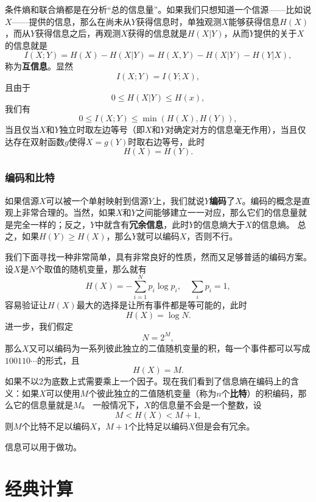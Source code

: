 \documentclass[UTF8, a4paper]{ctexart}
\begin{document}
条件熵和联合熵都是在分析“总的信息量”。如果我们只想知道一个信源——比如说$X$——提供的信息，那么在尚未从$Y$获得信息时，单独观测$X$能够获得信息$H(X)$，而从$Y$获得信息之后，再观测$X$获得的信息就是$H(X|Y)$，从而$Y$提供的关于$X$的信息就是
\begin{equation}
    I(X;Y) = H(X) - H(X|Y) = H(X, Y) - H(X|Y) - H(Y|X),
\end{equation}
称为\textbf{互信息}。显然
\begin{equation}
    I(X;Y) = I(Y;X),
\end{equation}
且由于
\[
    0 \leq H(X|Y) \leq H(x),
\]
我们有
\begin{equation}
    0 \leq I(X;Y) \leq \min(H(X), H(Y)),
\end{equation}
当且仅当$X$和$Y$独立时取左边等号（即$X$和$Y$对确定对方的信息毫无作用），当且仅达存在双射函数$g$使得$X=g(Y)$时取右边等号，此时
\[
    H(X) = H(Y).
\]

\subsubsection{编码和比特}

如果信源$X$可以被一个单射映射到信源$Y$上，我们就说$Y$\textbf{编码}了$X$。编码的概念是直观上非常合理的。当然，如果$X$和$Y$之间能够建立一一对应，那么它们的信息量就是完全一样的；反之，$Y$中就含有\textbf{冗余信息}，此时$Y$的信息熵大于$X$的信息熵。
总之，如果$H(Y) \geq H(X)$，那么$Y$就可以编码$X$，否则不行。

我们下面寻找一种非常简单，具有非常良好的性质，然而又足够普适的编码方案。设$X$是$N$个取值的随机变量，那么就有
\[
    H(X) = - \sum_{i=1}^N p_i \log p_i, \quad \sum_i p_i = 1,
\]
容易验证让$H(X)$最大的选择是让所有事件都是等可能的，此时
\begin{equation}
    H(X) = \log N.
\end{equation}
进一步，我们假定
\[
    N = 2^M,
\]
那么$X$又可以编码为一系列彼此独立的二值随机变量的积，每一个事件都可以写成$100110\cdots$的形式，且
\[
    H(X) = M.
\]
如果不以$2$为底数上式需要乘上一个因子。现在我们看到了信息熵在编码上的含义：如果$X$可以使用$M$个彼此独立的二值随机变量（称为$n$个\textbf{比特}）的积编码，那么它的信息量就是$M$。
一般情况下，$X$的信息量不会是一个整数，设
\[
    M < H(X) < M+1,
\]
则$M$个比特不足以编码$X$，$M+1$个比特足以编码$X$但是会有冗余。

信息可以用于做功。

\section{经典计算}
\end{document}
